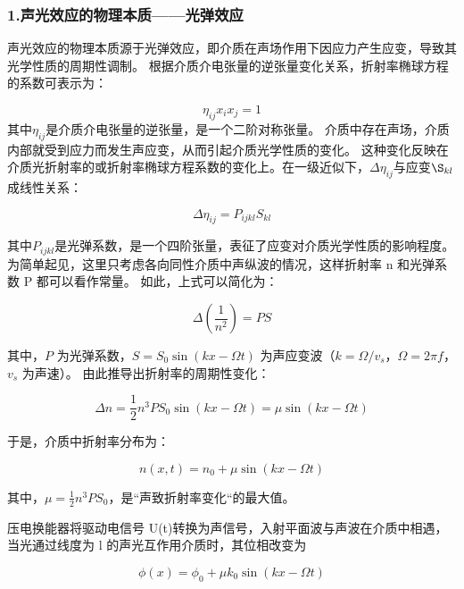 \documentclass[12pt,a4paper,UTF8]{ctexart}
\begin{document}
\subsubsection*{1.声光效应的物理本质——光弹效应}
	声光效应的物理本质源于光弹效应，即介质在声场作用下因应力产生应变，导致其光学性质的周期性调制。
	根据介质介电张量的逆张量变化关系，折射率椭球方程的系数可表示为：

	\begin{equation}
		\eta_{ij}x_{i}x_{j}  = 1
	\end{equation}
	其中$\eta_{ij}$是介质介电张量的逆张量，是一个二阶对称张量。
	介质中存在声场，介质内部就受到应力而发生声应变，从而引起介质光学性质的变化。
	这种变化反映在介质光折射率的或折射率椭球方程系数的变化上。在一级近似下，$\Delta \eta_{ij}$与应变$\S_{kl}$成线性关系：

	\begin{equation}
		\Delta \eta_{ij} = P_{ijkl}S_{kl}
	\end{equation}
	
	其中$P_{ijkl}$是光弹系数，是一个四阶张量，表征了应变对介质光学性质的影响程度。
	为简单起见，这里只考虑各向同性介质中声纵波的情况，这样折射率 n 和光弹系数 P 都可以看作常量。
	如此，上式可以简化为：

	\begin{equation}
		\Delta \left( \frac{1}{n^2} \right) = PS 
	\end{equation}

	其中，\( P \) 为光弹系数，\( S = S_0 \sin(kx - \Omega t) \) 为声应变波（\( k = \Omega / v_s \)，\( \Omega = 2\pi f \)，\( v_s \) 为声速）。
	由此推导出折射率的周期性变化：
	
	\begin{equation}
		\Delta n = \frac{1}{2} n^3 P S_0 \sin(kx - \Omega t) = \mu \sin(kx - \Omega t)
	\end{equation}

	于是，介质中折射率分布为：

	\begin{equation}
		n(x,t) = n_0 + \mu \sin(kx - \Omega t)
	\end{equation}
	
	其中，$\mu = \frac{1}{2} n^3 P S_0$，是“声致折射率变化“的最大值。

	压电换能器将驱动电信号 U(t)转换为声信号，入射平面波与声波在介质中相遇，当光通过线度为 l 的声光互作用介质时，其位相改变为
	
	\begin{equation}
		\phi(x) = \phi_0 +  \mu k_0 \sin(kx - \Omega t)
	\end{equation}
	
\end{document}
